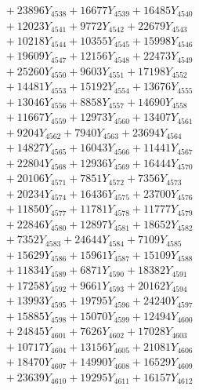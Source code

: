 \documentclass[a4paper,10pt]{article}
\begin{document}
{\begin{align}
&\;  + 23896 Y_{4538} + 16677 Y_{4539} + 16485 Y_{4540} \\[0.3ex]
&\;  + 12023 Y_{4541} + 9772 Y_{4542} + 22679 Y_{4543} \\[0.3ex]
&\;  + 10218 Y_{4544} + 10355 Y_{4545} + 15998 Y_{4546} \\[0.3ex]
&\;  + 19609 Y_{4547} + 12156 Y_{4548} + 22473 Y_{4549} \\[0.3ex]
&\;  + 25260 Y_{4550} + 9603 Y_{4551} + 17198 Y_{4552} \\[0.3ex]
&\;  + 14481 Y_{4553} + 15192 Y_{4554} + 13676 Y_{4555} \\[0.3ex]
&\;  + 13046 Y_{4556} + 8858 Y_{4557} + 14690 Y_{4558} \\[0.5ex]\allowbreak
&\;  + 11667 Y_{4559} + 12973 Y_{4560} + 13407 Y_{4561} \\[0.3ex]
&\;  + 9204 Y_{4562} + 7940 Y_{4563} + 23694 Y_{4564} \\[0.3ex]
&\;  + 14827 Y_{4565} + 16043 Y_{4566} + 11441 Y_{4567} \\[0.3ex]
&\;  + 22804 Y_{4568} + 12936 Y_{4569} + 16444 Y_{4570} \\[0.3ex]
&\;  + 20106 Y_{4571} + 7851 Y_{4572} + 7356 Y_{4573} \\[0.3ex]
&\;  + 20234 Y_{4574} + 16436 Y_{4575} + 23700 Y_{4576} \\[0.3ex]
&\;  + 11850 Y_{4577} + 11781 Y_{4578} + 11777 Y_{4579} \\[0.3ex]
&\;  + 22846 Y_{4580} + 12897 Y_{4581} + 18652 Y_{4582} \\[0.3ex]
&\;  + 7352 Y_{4583} + 24644 Y_{4584} + 7109 Y_{4585} \\[0.3ex]
&\;  + 15629 Y_{4586} + 15961 Y_{4587} + 15109 Y_{4588} \\[0.5ex]\allowbreak
&\;  + 11834 Y_{4589} + 6871 Y_{4590} + 18382 Y_{4591} \\[0.3ex]
&\;  + 17258 Y_{4592} + 9661 Y_{4593} + 20162 Y_{4594} \\[0.3ex]
&\;  + 13993 Y_{4595} + 19795 Y_{4596} + 24240 Y_{4597} \\[0.3ex]
&\;  + 15885 Y_{4598} + 15070 Y_{4599} + 12494 Y_{4600} \\[0.3ex]
&\;  + 24845 Y_{4601} + 7626 Y_{4602} + 17028 Y_{4603} \\[0.3ex]
&\;  + 10717 Y_{4604} + 13156 Y_{4605} + 21081 Y_{4606} \\[0.3ex]
&\;  + 18470 Y_{4607} + 14990 Y_{4608} + 16529 Y_{4609} \\[0.3ex]
&\;  + 23639 Y_{4610} + 19295 Y_{4611} + 16157 Y_{4612} \\[0.3ex]

\end{align}}
\end{document}
